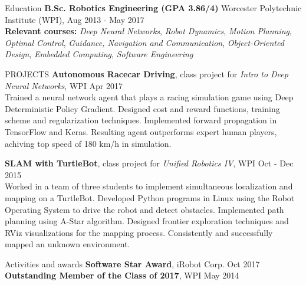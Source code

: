\documentclass{resume} %
\begin{document}
\begin{rSection}{Education}
{\bf B.Sc. Robotics Engineering (GPA 3.86/4)} Worcester Polytechnic Institute (WPI), \hfill {Aug 2013 - May 2017}\\
{\bf{Relevant courses:}} \emph{Deep Neural Networks}, \emph{Robot Dynamics}, \emph{Motion Planning}, \emph{Optimal Control}, \emph{Guidance, Navigation and Communication}, \emph{Object-Oriented Design}, \emph{Embedded Computing}, \emph{Software Engineering}
\end{rSection}

\begin{rSection}{PROJECTS}
{\bf{Autonomous Racecar Driving}}, class project for \emph{Intro to Deep Neural Networks}, WPI \hfill Apr 2017 \\
Trained a neural network agent that plays a racing simulation game using Deep Deterministic Policy Gradient. Designed cost and reward functions, training scheme and regularization techniques. Implemented forward propagation in TensorFlow and Keras. Resulting agent outperforms expert human players, achiving top speed of 180 km/h in simulation.

{\bf{SLAM with TurtleBot}}, class project for \emph{Unified Robotics IV}, WPI \hfill Oct - Dec 2015 \\
Worked in a team of three students to implement simultaneous localization and mapping on a TurtleBot. Developed Python programs in Linux using the Robot Operating System to drive the robot and detect obstacles. Implemented path planning using A-Star algorithm. Designed frontier exploration techniques and RViz visualizations for the mapping process. Consistently and successfully mapped an unknown environment.
\end{rSection} 

\begin{rSection}{Activities and awards}
{\bf{Software Star Award}}, iRobot Corp. \hfill Oct 2017 \\
{\bf{Outstanding Member of the Class of 2017}}, WPI \hfill May 2014
\end{rSection}
\end{document}
